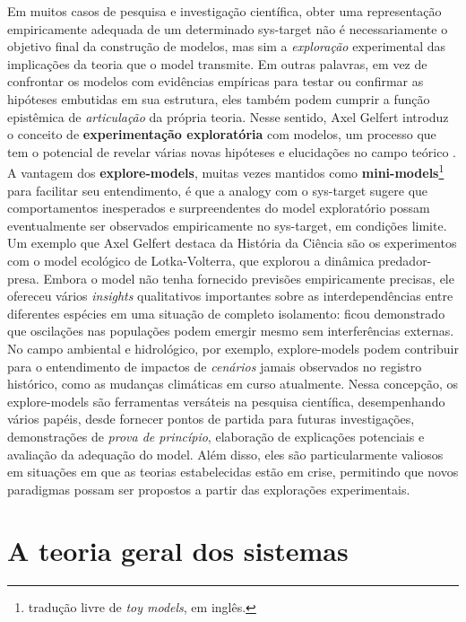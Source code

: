 \documentclass[./main.tex]{subfiles}
\begin{document}
\par Em muitos casos de pesquisa e investigação científica, obter uma representação empiricamente adequada de um determinado \gls{sys-target} não é necessariamente o objetivo final da construção de modelos, mas sim a \textit{exploração} experimental das implicações da \gls{teoria} que o \gls{model} transmite. Em outras palavras, em vez de confrontar os modelos com evidências empíricas para testar ou confirmar as hipóteses embutidas em sua estrutura, eles também podem cumprir a função epistêmica de \textit{articulação} da própria \gls{teoria}. Nesse sentido, Axel Gelfert introduz o conceito de \textbf{experimentação exploratória} com modelos, um processo que tem o potencial de revelar várias novas hipóteses e elucidações no campo teórico \cite{gelfert2016}. A vantagem dos \textbf{\gls{explore-models}}, muitas vezes mantidos como \textbf{\gls{mini-models}}\footnote{tradução livre de \textit{toy models}, em inglês.} para facilitar seu entendimento, é que a \gls{analogy} com o \gls{sys-target} sugere que comportamentos inesperados e surpreendentes do \gls{model} exploratório possam eventualmente ser observados empiricamente no \gls{sys-target}, em condições limite. Um exemplo que Axel Gelfert destaca da História da Ciência são os experimentos com o \gls{model} ecológico de Lotka-Volterra, que explorou a dinâmica predador-presa. Embora o \gls{model} não tenha fornecido previsões empiricamente precisas, ele ofereceu vários \textit{insights} qualitativos importantes sobre as interdependências entre diferentes espécies em uma situação de completo isolamento: ficou demonstrado que oscilações nas populações podem emergir mesmo sem interferências externas. No campo ambiental e hidrológico, por exemplo, \gls{explore-models} podem contribuir para o entendimento de impactos de \textit{cenários} jamais observados no registro histórico, como as mudanças climáticas em curso atualmente. Nessa concepção, os \gls{explore-models} são ferramentas versáteis na pesquisa científica, desempenhando vários papéis, desde fornecer pontos de partida para futuras investigações, demonstrações de \textit{prova de princípio}, elaboração de explicações potenciais e avaliação da adequação do \gls{model}. Além disso, eles são particularmente valiosos em situações em que as teorias estabelecidas estão em crise, permitindo que novos paradigmas possam ser propostos a partir das explorações experimentais.

\section{A teoria geral dos sistemas} \label{sec:sys:systems}
\end{document}
